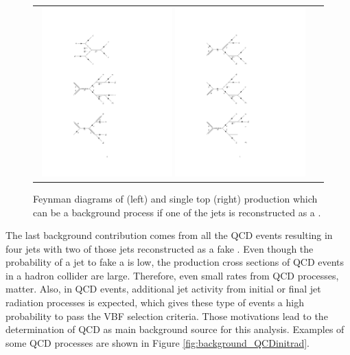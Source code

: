 \begin{figure}[tbh!]
	\centering
	\begin{tabular}{cc}
		\includegraphics[width=0.48\textwidth]{diagrams/pics/background_ttbar.pdf}
		\includegraphics[width=0.48\textwidth]{diagrams/pics/background_singlet.pdf}
	\end{tabular}
	\caption{Feynman diagrams of \ttbar (left) and single top (right) production which can be a background process if one of the jets is reconstructed as a \hadtau.}
	\label{fig:background_ttbar}
\end{figure}

The last background contribution comes from all the QCD events resulting in four jets with two of those jets reconstructed as a fake \hadtau. Even though the probability of a jet to fake a \hadtau is low, the production cross sections of QCD events in a hadron collider are large. Therefore, even small \hadtaufake rates from QCD processes, matter. Also, in QCD events, additional jet activity from initial or final jet radiation processes is expected, which gives these type of events a high probability to pass the VBF selection criteria. Those motivations lead to the determination of QCD as main background source for this analysis. Examples of some QCD processes are shown in Figure \ref{fig:background_QCDinitrad}.

